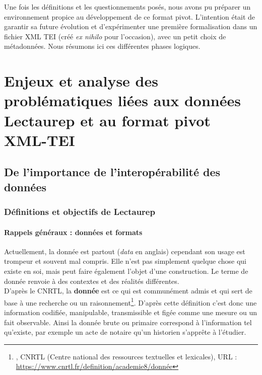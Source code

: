 Une fois les définitions et les questionnements posés, nous avons pu préparer un environnement propice au développement  de ce format pivot. L'intention était de garantir sa future évolution et d'expérimenter une première formalisation dans un fichier XML TEI (créé \textit{ex nihilo} pour l'occasion), avec un petit choix de métadonnées. Nous résumons ici ces différentes phases logiques.
\clearpage
\thispagestyle{empty}
\chapter{Enjeux et analyse des problématiques liées aux données Lectaurep et au format pivot XML-TEI}
\section{De l'importance de l'interopérabilité des données}
\subsection{Définitions et objectifs de Lectaurep}
\subsubsection{Rappels généraux : données et formats}

Actuellement, la donnée est partout (\textit{data} en anglais) cependant son usage est trompeur et souvent mal compris. Elle n'est pas simplement quelque chose qui existe en soi, mais peut faire également l'objet d'une construction. Le terme de donnée renvoie à des contextes et des réalités différentes.\\

D'après le CNRTL, la \textbf{donnée} est ce qui est communément admis et qui sert de base à une recherche ou un raisonnement\footnote{, CNRTL (Centre national des ressources textuelles et lexicales), URL : \url{https://www.cnrtl.fr/definition/academie8/donnée}}. D'après cette définition c'est donc une information codifiée, manipulable, transmissible et figée comme une mesure ou un fait observable. Ainsi la donnée brute ou primaire correspond à l'information tel qu'existe, par exemple un acte de notaire qu'un historien s'apprête à l'étudier.\\

